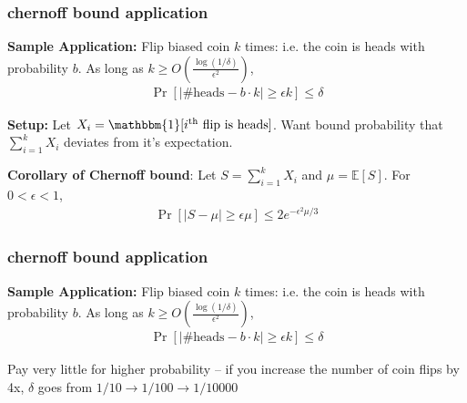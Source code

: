 \documentclass[compress]{beamer}
\newcommand{\bv}[1]{\mathbf{#1}}
\newcommand{\E}{\mathbb{E}}
\begin{document}
\begin{frame}
	\frametitle{chernoff bound application}
	\small
	\textbf{Sample Application:} Flip biased coin $k$ times: i.e. the coin is heads with probability $b$. As long as $k \geq O\left(\frac{\log(1/\delta)}{\epsilon^2}\right)$,
	\vspace{-.5em}
	\begin{align*}
		\Pr[|\text{\# heads} - b\cdot k| \geq \epsilon k] \leq \delta 
	\end{align*}
	
	\textbf{Setup:}
	Let $X_i = \mathbbm{1}[i^\text{th} \text{ flip is heads}]$. Want bound probability that  $\sum_{i=1}^k X_i$ deviates from it's expectation.
	
	\textbf{Corollary of Chernoff bound}: Let $S = \sum_{i=1}^k X_i$ and $\mu = \E[S]$. For $0< \epsilon < 1$, 
	\vspace{-.75em}
	\begin{align*}
		\Pr[|S - \mu| \geq \epsilon \mu] \leq 2e^{-\epsilon^2 \mu/3}
	\end{align*} 
	\vspace{6em}
\end{frame}

\begin{frame}
	\frametitle{chernoff bound application}
	\textbf{Sample Application:} Flip biased coin $k$ times: i.e. the coin is heads with probability $b$. As long as $k \geq O\left(\frac{\log(1/\delta)}{\epsilon^2}\right)$,
	\begin{align*}
		\Pr[|\text{\# heads} - b\cdot k| \geq \epsilon k] \leq \delta 
	\end{align*}
	
	
	
	Pay very little for higher probability -- if you increase the number of coin flips by 4x, $\delta$ goes from $1/10 \rightarrow 1/100 \rightarrow 1/10000$
\end{frame}

%	
%	
%	
%	
%	
\end{document}

